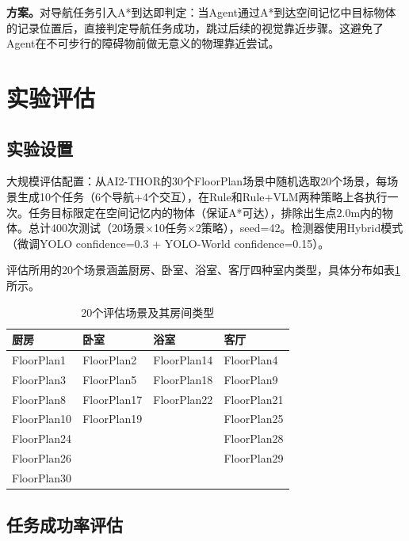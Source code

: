 \documentclass{SYSUReport}
\begin{document}
\textbf{方案。}对导航任务引入A*到达即判定：当Agent通过A*到达空间记忆中目标物体的记录位置后，直接判定导航任务成功，跳过后续的视觉靠近步骤。这避免了Agent在不可步行的障碍物前做无意义的物理靠近尝试。



\section{实验评估}

\subsection{实验设置}

大规模评估配置：从AI2-THOR的30个FloorPlan场景中随机选取20个场景，每场景生成10个任务（6个导航+4个交互），在Rule和Rule+VLM两种策略上各执行一次。任务目标限定在空间记忆内的物体（保证A*可达），排除出生点2.0m内的物体。总计400次测试（20场景×10任务×2策略），seed=42。检测器使用Hybrid模式（微调YOLO confidence=0.3 + YOLO-World confidence=0.15）。

评估所用的20个场景涵盖厨房、卧室、浴室、客厅四种室内类型，具体分布如表\ref{tab:eval_scenes}所示。

\begin{table}[!ht]
  \centering
  \caption{20个评估场景及其房间类型}
  \label{tab:eval_scenes}
  \begin{tabular}{llll}
    \toprule
    厨房 & 卧室 & 浴室 & 客厅 \\
    \midrule
    FloorPlan1  & FloorPlan2  & FloorPlan14 & FloorPlan4  \\
    FloorPlan3  & FloorPlan5  & FloorPlan18 & FloorPlan9  \\
    FloorPlan8  & FloorPlan17 & FloorPlan22 & FloorPlan21 \\
    FloorPlan10 & FloorPlan19 &             & FloorPlan25 \\
    FloorPlan24 &             &             & FloorPlan28 \\
    FloorPlan26 &             &             & FloorPlan29 \\
    FloorPlan30 &             &             &             \\
    \bottomrule
  \end{tabular}
\end{table}

\subsection{任务成功率评估}
\end{document}
